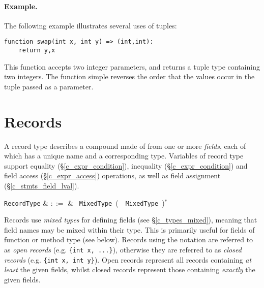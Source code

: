 \paragraph{Example.} The following example illustrates several uses of tuples:

\begin{lstlisting}
function swap(int x, int y) => (int,int):
    return y,x
\end{lstlisting}
This function accepts two integer parameters, and returns a tuple type containing two integers.  The function simple reverses the order that the values occur in the tuple passed as a parameter.
 

\section{Records}
\label{c_types_record}

A record type describes a compound made of from one or more {\em fields}, each of which has a unique name and a corresponding type.  Variables of record type support equality (\S\ref{c_expr_condition}), inequality (\S\ref{c_expr_condition}) and field access (\S\ref{c_expr_access}) operations, as well as field assignment (\S\ref{c_stmts_field_lval}).

\begin{syntax}
  \verb+RecordType+ & $::=$ & \token{\{}\ \verb+MixedType+\
  \big(\ \token{,}\ \verb+MixedType+\
  \big)$^*$ \ \token{\}}\\
\end{syntax}

Records use {\em mixed types} for defining fields (see \S\ref{c_types_mixed}), meaning that field names may be mixed within their type.  This is primarily useful for fields of function or method type (see below).  Records using the  notation are referred to as {\em open records} (e.g. \lstinline|{int x, ...}|), otherwise they are referred to as {\em closed records} (e.g. \lstinline|{int x, int y}|).  Open records represent all records containing {\em at least} the given fields, whilst closed records represent those containing {\em exactly} the given fields.   

